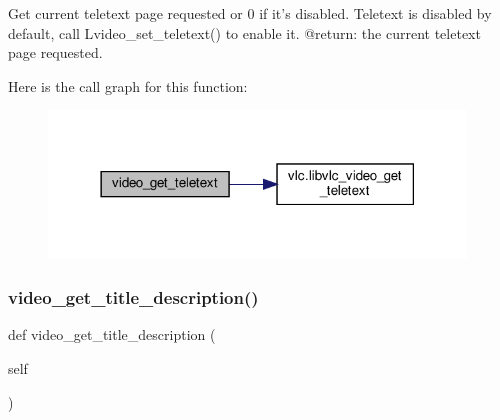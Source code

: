 \begin{DoxyVerb}Get current teletext page requested or 0 if it's disabled.
Teletext is disabled by default, call L{video_set_teletext}() to enable
it.
@return: the current teletext page requested.
\end{DoxyVerb}
 Here is the call graph for this function\+:
\nopagebreak
\begin{figure}[H]
\begin{center}
\leavevmode
\includegraphics[width=314pt]{classvlc_1_1_media_player_a555e37de8f91b1de2d6991bfc19d01b2_cgraph}
\end{center}
\end{figure}
\mbox{\label{classvlc_1_1_media_player_a2e9b941fc96e22aa8f7c1a0e48c1e6d1}} 
\subsubsection{\texorpdfstring{video\+\_\+get\+\_\+title\+\_\+description()}{video\_get\_title\_description()}}
{\footnotesize\ttfamily def video\+\_\+get\+\_\+title\+\_\+description (\begin{DoxyParamCaption}\item[{}]{self }\end{DoxyParamCaption})}


